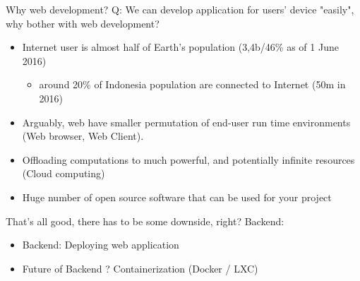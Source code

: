 \documentclass{beamer}
\begin{document}
  
  \begin{frame}{Why web development?}
	\pause
	Q: We can develop application for users' device "easily", why bother with web development?

	\pause
	\begin{itemize}[<+->]
	
		\item Internet user is almost half of Earth's population (3,4b/46\% as of 1 June 2016)\footnotemark[1]
			\begin{itemize}[<+->]
				\item around 20\% of Indonesia population are connected to Internet (50m in 2016\footnotemark[1])
			\end{itemize}
			
		\item Arguably, web have smaller permutation of end-user run time environments (Web browser, Web Client).
		
		\item Offloading computations to much powerful, and potentially infinite resources (Cloud computing)
		
		\item Huge number of open source software that can be used for your project
		
	\end{itemize}

  \end{frame}
  
  
  
  \begin{frame}{That's all good, there has to be some downside, right?}
  	\pause
	Backend:
	\pause
	\begin{itemize}[<+->]
		\item Backend: Deploying web application
		\item Future of Backend ? \pause Containerization (Docker / LXC)
  	\end{itemize}
  \end{frame}
  
\end{document}
